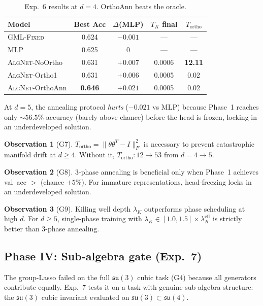 \documentclass[11pt,a4paper]{article}
\newcommand{\fksu}{\mathfrak{su}}
\newcommand{\TK}{T_K}
\newcommand{\Tortho}{T_{\mathrm{ortho}}}
\newcommand{\AlgNet}{\textsc{AlgNet}}
\newcommand{\GMLFixed}{\textsc{GML-Fixed}}
\theoremstyle{definition}
\newtheorem{observation}{Observation}
\begin{document}
\begin{table}[H]
\centering
\caption{Exp.~6 results at $d = 4$. OrthoAnn beats the oracle.}
\label{tab:exp6_d4}
\begin{tabular}{lcccc}
\toprule
Model & Best Acc & $\Delta$(MLP) & $\TK$ final & $\Tortho$ \\
\midrule
\GMLFixed{} & 0.624 & $-0.001$ & --- & --- \\
MLP & 0.625 & 0 & --- & --- \\
\AlgNet{}-NoOrtho & 0.631 & $+0.007$ & 0.0006 & \textbf{12.11} \\
\AlgNet{}-Ortho1 & 0.631 & $+0.006$ & 0.0005 & 0.02 \\
\AlgNet{}-OrthoAnn & \textbf{0.646} & $+\mathbf{0.021}$ & 0.0005 & 0.02 \\
\bottomrule
\end{tabular}
\end{table}

At $d = 5$, the annealing protocol \emph{hurts} ($-0.021$ vs MLP) 
because Phase~1 reaches only $\sim 56.5\%$ accuracy (barely above 
chance) before the head is frozen, locking in an underdeveloped 
solution.

\begin{observation}[G7]
$\Tortho = \|\theta\theta^T - I\|_F^2$ is necessary to prevent 
catastrophic manifold drift at $d \geq 4$. Without it, 
$\Tortho: 12 \to 53$ from $d = 4 \to 5$.
\end{observation}

\begin{observation}[G8]
3-phase annealing is beneficial only when Phase~1 achieves 
val~acc $>$ (chance $+ 5\%$). For immature representations, 
head-freezing locks in an underdeveloped solution.
\end{observation}

\begin{observation}[G9]
Killing well depth $\lambda_K$ outperforms phase scheduling at high 
$d$. For $d \geq 5$, single-phase training with 
$\lambda_K \in [1.0, 1.5] \times \lambda_K^{\mathrm{eff}}$ is 
strictly better than 3-phase annealing.
\end{observation}


\subsection{Phase IV: Sub-algebra gate (Exp.~7)}
\label{sec:phase4}

The group-Lasso failed on the full $\fksu(3)$ cubic task (G4) because 
all generators contribute equally. Exp.~7 tests it on a task with 
genuine sub-algebra structure: the $\fksu(3)$ cubic invariant evaluated 
on $\fksu(3) \subset \fksu(4)$.
\end{document}
